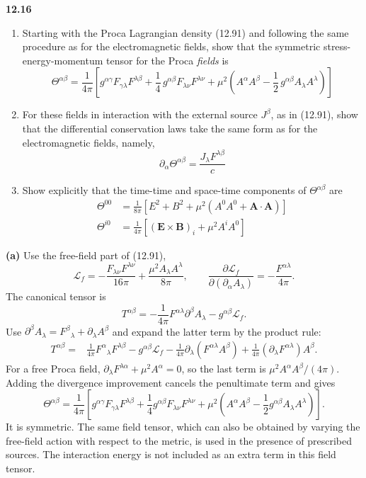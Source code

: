 \par\bigskip
\noindent\textbf{12.16}\quad\begin{enumerate}
\item[(a)] Starting with the Proca Lagrangian density (12.91) and following the same procedure as for the electromagnetic fields, show that the symmetric stress-energy-momentum tensor for the Proca \emph{fields} is
\[
\Theta^{\alpha\beta}=\frac{1}{4\pi}\left[g^{\alpha\gamma}F_{\gamma\lambda}F^{\lambda\beta}+\frac{1}{4}\,g^{\alpha\beta}F_{\lambda\nu}F^{\lambda\nu}+\mu^{2}\!\left(A^{\alpha}A^{\beta}-\frac{1}{2}\,g^{\alpha\beta}A_{\lambda}A^{\lambda}\right)\right]
\]
\item[(b)] For these fields in interaction with the external source $J^{\beta}$, as in (12.91), show that the differential conservation laws take the same form as for the electromagnetic fields, namely,
\[
\partial_{\alpha}\Theta^{\alpha\beta}=\frac{J_{\lambda}F^{\lambda\beta}}{c}
\]
\item[(c)] Show explicitly that the time-time and space-time components of $\Theta^{\alpha\beta}$ are
\begin{align*}
\Theta^{00}&=\frac{1}{8\pi}\left[E^{2}+B^{2}+\mu^{2}(A^{0}A^{0}+\mathbf{A}\cdot\mathbf{A})\right]\\[4pt]
\Theta^{i0}&=\frac{1}{4\pi}\left[(\mathbf{E}\times\mathbf{B})_{i}+\mu^{2}A^{i}A^{0}\right]
\end{align*}
\end{enumerate}
\solution

\medskip\noindent\textbf{(a)} Use the free-field part of (12.91),
\[
\mathcal L_f=-\frac{F_{\lambda\nu}F^{\lambda\nu}}{16\pi}
 +\frac{\mu^2A_\lambda A^\lambda}{8\pi},\qquad
\frac{\partial\mathcal L_f}{\partial(\partial_\alpha A_\lambda)}
=-\frac{F^{\alpha\lambda}}{4\pi}.
\]
The canonical tensor is
\[
T^{\alpha\beta}=-\frac1{4\pi}F^{\alpha\lambda}\partial^\beta A_\lambda
-g^{\alpha\beta}\mathcal L_f.
\]
Use $\partial^\beta A_\lambda=F^\beta{}_{\lambda}+\partial_\lambda A^\beta$
and expand the latter term by the product rule:
\begin{align*}
T^{\alpha\beta}={}&\frac1{4\pi}F^\alpha{}_{\lambda}F^{\lambda\beta}
-g^{\alpha\beta}\mathcal L_f
-\frac1{4\pi}\partial_\lambda(F^{\alpha\lambda}A^\beta)
+\frac1{4\pi}(\partial_\lambda F^{\alpha\lambda})A^\beta.
\end{align*}
For a free Proca field,
$\partial_\lambda F^{\lambda\alpha}+\mu^2A^\alpha=0$, so the
last term is $\mu^2A^\alpha A^\beta/(4\pi)$.
Adding the divergence improvement cancels the penultimate term
and gives
\[
\boxed{\Theta^{\alpha\beta}=\frac1{4\pi}\left[
 g^{\alpha\gamma}F_{\gamma\lambda}F^{\lambda\beta}
 +\frac14g^{\alpha\beta}F_{\lambda\nu}F^{\lambda\nu}
 +\mu^2\left(A^\alpha A^\beta-\frac12g^{\alpha\beta}A_\lambda A^\lambda\right)
\right].}
\]
It is symmetric.  The same field tensor, which can also be obtained
by varying the free-field action with respect to the metric, is used
in the presence of prescribed sources.  The interaction energy is
not included as an extra term in this field tensor.

